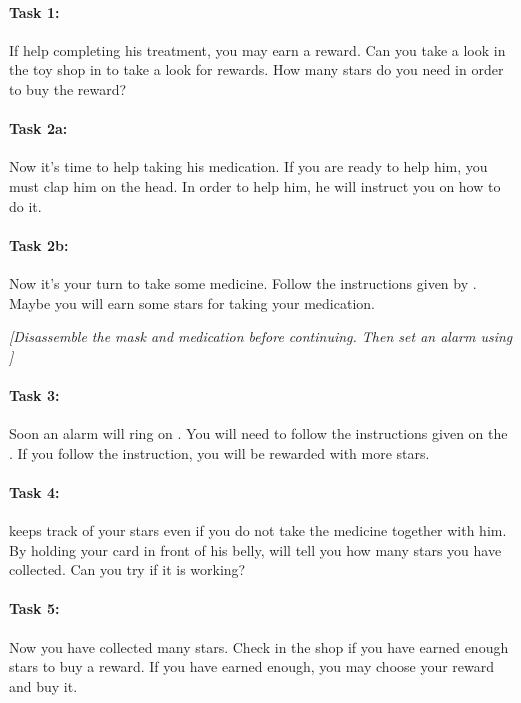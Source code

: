 \paragraph{Task 1:}

If help \ab{} completing his treatment, you may earn a reward. Can you take a look in the toy shop in \app{} to take a look for rewards. How many stars do you need in order to buy the reward?


\paragraph{Task 2a:}

Now it's time to help \ab{} taking his medication. If you are ready to help him, you must clap him on the head. In order to help him, he will instruct you on how to do it. 


\paragraph{Task 2b:}

Now it's your turn to take some medicine. Follow the instructions given by \ab{}. Maybe you will earn some stars for taking your medication.

\emph{[Disassemble the mask and medication before continuing. Then set an alarm using \app{}]}


\paragraph{Task 3:}

Soon an alarm will ring on \app{}. You will need to follow the instructions given on the \app{}. If you follow the instruction, you will be rewarded with more stars. 


\paragraph{Task 4:} 
\ab{} keeps track of your stars even if you do not take the medicine together with him. By holding your card in front of his belly, \ab{} will tell you how many stars you have collected. Can you try if it is working?


\paragraph{Task 5:}
Now you have collected many stars. Check in the shop if you have earned enough stars to buy a reward. If you have earned enough, you may choose your reward and buy it. 


